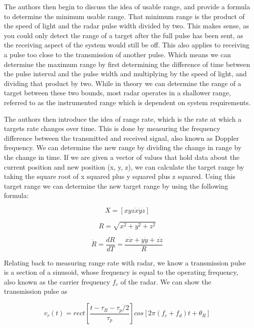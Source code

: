 \documentclass[12pt]{article}
\begin{document}
The authors then begin to discuss the idea of usable range, and provide a formula to determine the minimum usable range. That minimum range is the product of the speed of light and the radar pulse width divided by two. This makes sense, as you could only detect the range of a target after the full pulse has been sent, as the receiving aspect of the system would still be off. This also applies to receiving a pulse too close to the transmission of another pulse. Which means we can determine the maximum range by first determining the difference of time between the pulse interval and the pulse width and multiplying by the speed of light, and dividing that product by two. While in theory we can determine the range of a target between these two bounds, most radar operates in a shallower range, referred to as the instrumented range which is dependent on system requirements. 

The authors then introduce the idea of range rate, which is the rate at which a targets rate changes over time. This is done by measuring the frequency difference between the transmitted and received signal, also known as Doppler frequency. We can determine the new range by dividing the change in range by the change in time. If we are given a vector of values that hold data about the current position and new position (x, y, z), we can calculate the target range by taking the square root of x squared plus y squared plus z squared. Using this target range we can determine the new target range by using the following formula:

\begin{equation}
    X = [x y z \dot{x} \dot{y} \dot{z}]
\end{equation}

\begin{equation}
    R = \sqrt{x^2 + y^2 + z^2}
\end{equation}

\begin{equation}
    \dot{R} = \frac{dR}{dT} = \frac{x\dot{x}+y\dot{y}+z\dot{z}}{R}
\end{equation}

Relating back to measuring range rate with radar, we know a transmission pulse is a section of a sinusoid, whose frequency is equal to the operating frequency, also known as the carrier frequency $f_c$ of the radar. We can show the transmission pulse as

\begin{equation}
    v_r (t) = rect \left[ \frac{t - \tau_R - \tau_p / 2}{\tau_p} \right] cos \left[  2 \pi (f_c + f_d)t + \theta_R \right]
\end{equation}
\end{document}
